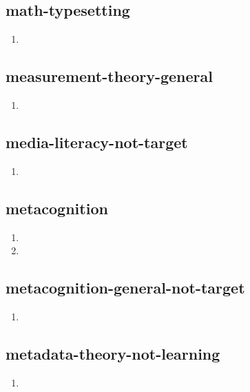 \documentclass{article}
\begin{document}
\subsection{math-typesetting}
\begin{enumerate}
\item {}
\end{enumerate}

\subsection{measurement-theory-general}
\begin{enumerate}
\item {}
\end{enumerate}

\subsection{media-literacy-not-target}
\begin{enumerate}
\item {}
\end{enumerate}

\subsection{metacognition}
\begin{enumerate}
\item {}
\item {}
\end{enumerate}

\subsection{metacognition-general-not-target}
\begin{enumerate}
\item {}
\end{enumerate}

\subsection{metadata-theory-not-learning}
\begin{enumerate}
\item {}
\end{enumerate}
\end{document}
